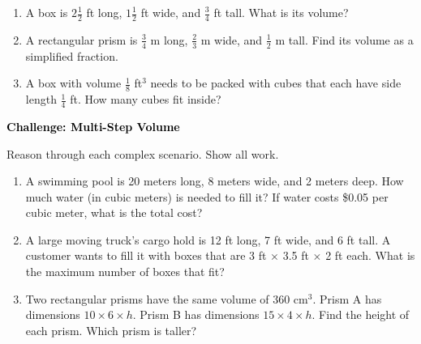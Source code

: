 \documentclass[12pt, letterpaper, fleqn]{article}
\begin{document}
\begin{enumerate}[itemsep=2.3cm, leftmargin=0.6cm]

\item A box is $2\frac{1}{2}$ ft long, $1\frac{1}{2}$ ft wide, and $\frac{3}{4}$ ft tall. What is its volume?

\vspace{2.2cm}

\item A rectangular prism is $\frac{3}{4}$ m long, $\frac{2}{3}$ m wide, and $\frac{1}{2}$ m tall. Find its volume as a simplified fraction.

\vspace{2.2cm}

\item A box with volume $\frac{1}{8}$ ft$^3$ needs to be packed with cubes that each have side length $\frac{1}{4}$ ft. How many cubes fit inside?

\vspace{2.5cm}

\end{enumerate}

\newpage

\begin{tcolorbox}[colback=black!10]
\large\textcolor{black}{\textbf{Challenge: Multi-Step Volume}}
\end{tcolorbox}

\noindent
Reason through each complex scenario. Show all work.

\vspace{3mm}

\begin{enumerate}[itemsep=2.4cm, leftmargin=0.6cm]

\item A swimming pool is 20 meters long, 8 meters wide, and 2 meters deep. How much water (in cubic meters) is needed to fill it? If water costs \$0.05 per cubic meter, what is the total cost?

\vspace{2.3cm}

\item A large moving truck's cargo hold is 12 ft long, 7 ft wide, and 6 ft tall. A customer wants to fill it with boxes that are 3 ft $\times$ 3.5 ft $\times$ 2 ft each. What is the maximum number of boxes that fit?

\vspace{2.3cm}

\item Two rectangular prisms have the same volume of 360 cm$^3$. Prism A has dimensions $10 \times 6 \times h$. Prism B has dimensions $15 \times 4 \times h$. Find the height of each prism. Which prism is taller?

\vspace{2.5cm}

\end{enumerate}
\end{document}
